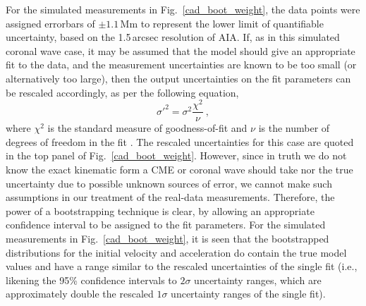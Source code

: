 \documentclass[structabstract]{aa}
\begin{document}
For the simulated measurements in Fig.~\ref{cad_boot_weight}, the data points were assigned errorbars of $\pm1.1$\,Mm to represent the lower limit of quantifiable uncertainty, based on the 1.5\,arcsec resolution of AIA. If, as in this simulated coronal wave case, it may be assumed that the model should give an appropriate fit to the data, and the measurement uncertainties are known to be too small (or alternatively too large), then the output uncertainties on the fit parameters can be rescaled accordingly, as per the following equation,
\begin{equation}
\sigma'^2 = \sigma^2 \frac{\chi^2}{\nu} \ ,
\end{equation}
where $\chi^2$ is the standard measure of goodness-of-fit and $\nu$ is the number of degrees of freedom in the fit \citep[see, for example,][]{2003drea.book.....B}. The rescaled uncertainties for this case are quoted in the top panel of Fig.~\ref{cad_boot_weight}. However, since in truth we do not know the exact kinematic form a CME or coronal wave should take nor the true uncertainty due to possible unknown sources of error, we cannot make such assumptions in our treatment of the real-data measurements. Therefore, the power of a bootstrapping technique is clear, by allowing an appropriate confidence interval to be assigned to the fit parameters. For the simulated measurements in Fig.~\ref{cad_boot_weight}, it is seen that the bootstrapped distributions for the initial velocity and acceleration do contain the true model values and have a range similar to the rescaled uncertainties of the single fit (i.e., likening the 95\% confidence intervals to $2\sigma$ uncertainty ranges, which are approximately double the rescaled $1\sigma$ uncertainty ranges of the single fit).
\end{document}
